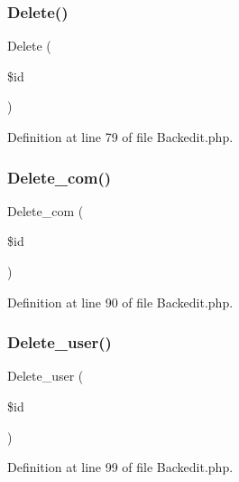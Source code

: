 \subsubsection{Delete()}
{\footnotesize\ttfamily Delete (\begin{DoxyParamCaption}\item[{}]{\$id }\end{DoxyParamCaption})}



Definition at line 79 of file Backedit.\+php.

\mbox{\label{class_src_1_1_controllers_1_1_backedit_a38147e014898a3417c74b23e903621b0}} 
\subsubsection{Delete\+\_\+com()}
{\footnotesize\ttfamily Delete\+\_\+com (\begin{DoxyParamCaption}\item[{}]{\$id }\end{DoxyParamCaption})}



Definition at line 90 of file Backedit.\+php.

\mbox{\label{class_src_1_1_controllers_1_1_backedit_ac8f9af14ff73b939d55940eb2ff886ee}} 
\subsubsection{Delete\+\_\+user()}
{\footnotesize\ttfamily Delete\+\_\+user (\begin{DoxyParamCaption}\item[{}]{\$id }\end{DoxyParamCaption})}



Definition at line 99 of file Backedit.\+php.

\mbox{\label{class_src_1_1_controllers_1_1_backedit_a82232b33fbfacdbdb8a8f49acaecf564}} 
